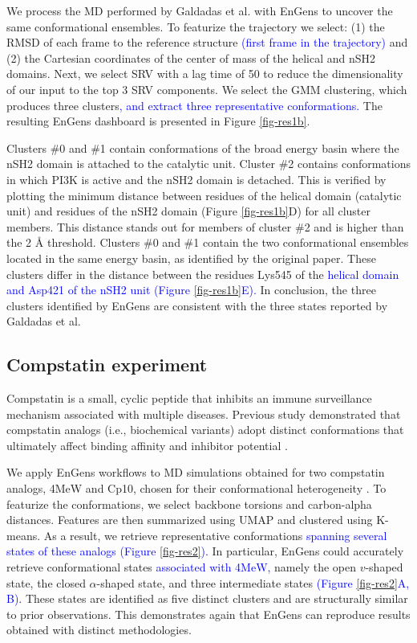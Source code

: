 \documentclass[unnumsec,webpdf,contemporary,large,numsquare]{oup-authoring-template}%
\theoremstyle{thmstyleone}%
\theoremstyle{thmstyletwo}%
\theoremstyle{thmstylethree}%
\begin{document}
We process the MD performed by Galdadas et al. with EnGens to uncover the same conformational ensembles. To featurize the trajectory we select: (1) the RMSD of each frame to the reference structure \textcolor{blue}{(first frame in the trajectory)} and (2) the Cartesian coordinates of the center of mass of the helical and nSH2 domains. Next, we select SRV with a lag time of 50 to reduce the dimensionality of our input to the top 3 SRV components. We select the GMM clustering, which produces three clusters\textcolor{blue}{, and extract three representative conformations.} The resulting EnGens dashboard is presented in Figure \ref{fig-res1b}. 

Clusters \#0 and \#1 contain conformations of the broad energy basin where the nSH2 domain is attached to the catalytic unit. Cluster \#2 contains conformations in which PI3K is active and the nSH2 domain is detached. This is verified by plotting the minimum distance between residues of the helical domain (catalytic unit) and residues of the nSH2 domain (Figure \ref{fig-res1b}D) for all cluster members. This distance stands out for members of cluster \#2 and is higher than the 2 Å threshold.  Clusters \#0 and \#1 contain the two conformational ensembles located in the same energy basin, as identified by the original paper. These clusters differ in the distance between the residues Lys545 of the \textcolor{blue}{helical domain and Asp421 of the nSH2 unit (Figure \ref{fig-res1b}E).}  In conclusion, the three clusters identified by EnGens are consistent with the three states reported by Galdadas et al.
 
\subsection{Compstatin experiment}

Compstatin is a small, cyclic peptide that inhibits an immune surveillance mechanism associated with multiple diseases. Previous study demonstrated that compstatin analogs (i.e., biochemical variants) adopt distinct conformations that ultimately affect binding affinity and inhibitor potential \citep{devaurs_computational_2020}. 

We apply EnGens workflows to MD simulations obtained for two compstatin analogs, 4MeW and Cp10, chosen for their conformational heterogeneity \citep{devaurs_computational_2020}. To featurize the conformations, we select backbone torsions and carbon-alpha distances. Features are then summarized using UMAP and clustered using K-means. As a result, we retrieve representative conformations \textcolor{blue}{spanning several states of these analogs (Figure \ref{fig-res2}).} In particular, EnGens could accurately retrieve conformational states \textcolor{blue}{associated with 4MeW,} namely the open $v$-shaped state, the closed $\alpha$-shaped state, and three intermediate states \textcolor{blue}{(Figure \ref{fig-res2}A, B)}. These states are identified as five distinct clusters and are structurally similar to prior observations. This demonstrates again that EnGens can reproduce results obtained with distinct methodologies. 
\end{document}
